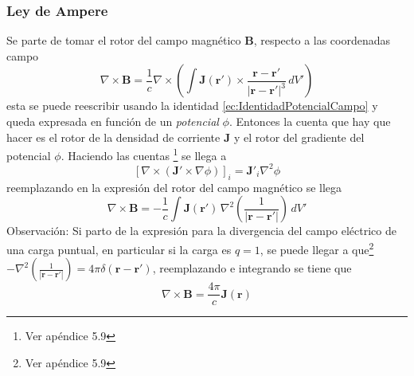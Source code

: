 \subsubsection{Ley de Ampere}
Se parte de tomar el rotor del campo magnético $\textbf{B}$, respecto a las coordenadas campo
\begin{equation*}
    \nabla \times \textbf{B} = 
     \frac{1}{c} \nabla \times 
     \left(
        \int \textbf{J}(\textbf{r}')
        \times \frac{\textbf{r}-\textbf{r}'}{|\textbf{r}-\textbf{r}'|^{3}}
        \,dV'
     \right)
\end{equation*}
esta se puede reescribir usando la identidad \eqref{ec:IdentidadPotencialCampo} y queda expresada en función de un \textit{potencial} $\phi$. Entonces la cuenta que hay que hacer es el rotor de la densidad de corriente $\textbf{J}$ y el rotor del gradiente del potencial $\phi$. Haciendo las cuentas \footnote{Ver apéndice 5.9} se llega a
\begin{equation*}
    \left[
        \nabla \times 
        \left(
            \textbf{J}'\times \nabla \phi
        \right)
    \right]_{i} 
    = \textbf{J}'_{i} \nabla^{2}\phi
\end{equation*}
reemplazando en la expresión del rotor del campo magnético se llega
\begin{equation*}
    \nabla \times \textbf{B} = -\frac{1}{c}
    \int \textbf{J}(\textbf{r}')\,
    \nabla^{2}
    \left(
        \frac{1}{|\textbf{r}-\textbf{r}'|}
    \right)\,
    dV'
\end{equation*}
Observación: Si parto de la expresión para la divergencia del campo eléctrico de una carga puntual, en particular si la carga es $q = 1$, se puede llegar a que\footnote{Ver apéndice 5.9} $-\nabla^{2}\left(\frac{1}{|\textbf{r}-\textbf{r}'|}\right) = 4\pi \delta(\textbf{r}-\textbf{r}')$, reemplazando e integrando se tiene que
\begin{equation*}
    \nabla \times \textbf{B} = 
    \frac{4\pi}{c} \textbf{J}(\textbf{r})
\end{equation*}


